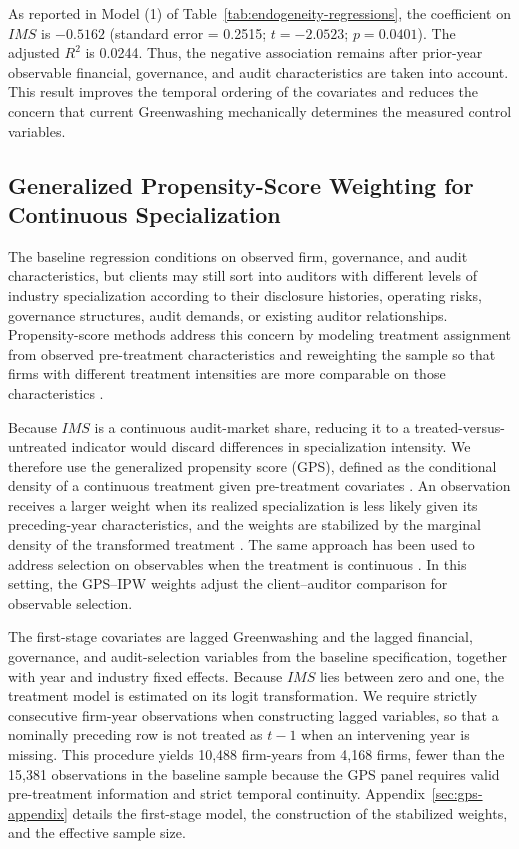 \documentclass[11pt]{article}
\begin{document}
As reported in Model (1) of Table~\ref{tab:endogeneity-regressions}, the coefficient on \(IMS\) is \(-0.5162\) (standard error = 0.2515; \(t=-2.0523\); \(p=0.0401\)). 
The adjusted \(R^2\) is 0.0244. 
Thus, the negative association remains after prior-year observable financial, governance, and audit characteristics are taken into account. 
This result improves the temporal ordering of the covariates and reduces the concern that current Greenwashing mechanically determines the measured control variables. 

\subsection{Generalized Propensity-Score Weighting for Continuous Specialization}

The baseline regression conditions on observed firm, governance, and audit characteristics, but clients may still sort into auditors with different levels of industry specialization according to their disclosure histories, operating risks, governance structures, audit demands, or existing auditor relationships.
Propensity-score methods address this concern by modeling treatment assignment from observed pre-treatment characteristics and reweighting the sample so that firms with different treatment intensities are more comparable on those characteristics \citep{shipman2017psm}.

Because \(IMS\) is a continuous audit-market share, reducing it to a treated-versus-untreated indicator would discard differences in specialization intensity.
We therefore use the generalized propensity score (GPS), defined as the conditional density of a continuous treatment given pre-treatment covariates \citep{imbens2000,hiranoimbens2004}.
An observation receives a larger weight when its realized specialization is less likely given its preceding-year characteristics, and the weights are stabilized by the marginal density of the transformed treatment \citep{robins2000msm}.
The same approach has been used to address selection on observables when the treatment is continuous \citep{campello2014sideshow,brick2024internal}.
In this setting, the GPS--IPW weights adjust the client--auditor comparison for observable selection.

The first-stage covariates are lagged Greenwashing and the lagged financial, governance, and audit-selection variables from the baseline specification, together with year and industry fixed effects.
Because \(IMS\) lies between zero and one, the treatment model is estimated on its logit transformation.
We require strictly consecutive firm-year observations when constructing lagged variables, so that a nominally preceding row is not treated as \(t-1\) when an intervening year is missing.
This procedure yields 10,488 firm-years from 4,168 firms, fewer than the 15,381 observations in the baseline sample because the GPS panel requires valid pre-treatment information and strict temporal continuity.
Appendix~\ref{sec:gps-appendix} details the first-stage model, the construction of the stabilized weights, and the effective sample size.
\end{document}

